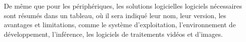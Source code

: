 ﻿{\color{red}
\par De même que pour les périphériques, les solutions logicielles logiciels nécessaires sont résumés dans un tableau, où il sera indiqué leur nom, leur version, les avantages et limitations, comme le système d'exploitation, l'environnement de développement, l'inférence, les logiciels de traitements vidéos et d'images. 
}